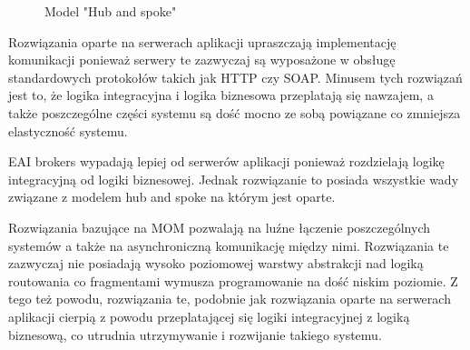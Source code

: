 \setlength\fboxsep{20pt}
\setlength\fboxrule{1pt}
\begin{figure}[!h]
	\centering
	\caption{Model "Hub and spoke"}\label{fig:hub_and_spoke}
\end{figure}

Rozwiązania oparte na serwerach aplikacji upraszczają implementację komunikacji ponieważ serwery te zazwyczaj są wyposażone w obsługę standardowych protokołów takich jak HTTP czy SOAP. Minusem tych rozwiązań jest to, że logika integracyjna i logika biznesowa przeplatają się nawzajem, a także poszczególne części systemu są dość mocno ze sobą powiązane co zmniejsza elastyczność systemu.

EAI brokers wypadają lepiej od serwerów aplikacji ponieważ rozdzielają logikę integracyjną od logiki biznesowej. Jednak rozwiązanie to posiada wszystkie wady związane z modelem hub and spoke na którym jest oparte.

Rozwiązania bazujące na MOM pozwalają na luźne łączenie poszczególnych systemów a także na asynchroniczną komunikację między nimi. Rozwiązania te zazwyczaj nie posiadają wysoko poziomowej warstwy abstrakcji nad logiką routowania co fragmentami wymusza programowanie na dość niskim poziomie. Z tego też powodu, rozwiązania te, podobnie jak rozwiązania oparte na serwerach aplikacji cierpią z powodu przeplatającej się logiki integracyjnej z logiką biznesową, co utrudnia utrzymywanie i rozwijanie takiego systemu.

